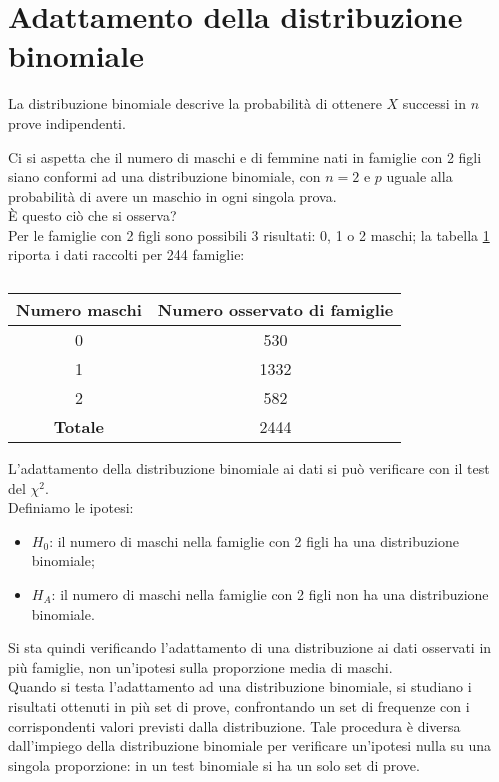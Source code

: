 \documentclass[drafts, 10pt]{book}
\newcounter{example}[section]
\begin{document}
\section{Adattamento della distribuzione binomiale}

La distribuzione binomiale descrive la probabilità di ottenere $X$ successi in $n$ prove indipendenti.

\begin{example}
Ci si aspetta che il numero di maschi e di femmine nati in famiglie con 2 figli siano conformi ad una distribuzione binomiale, con $n =2$ e $p$ uguale alla probabilità di avere un maschio in ogni singola prova.
\\
È questo ciò che si osserva?
\\
Per le famiglie con 2 figli sono possibili 3 risultati: 0, 1 o 2 maschi; la tabella \ref{tabmaschi} riporta i dati raccolti per 244 famiglie:
    \begin{table}[H]
        \centering
        \renewcommand\arraystretch{1.2}
        \begin{tabular}{c|c}
        \hline
        \textbf{Numero maschi} & \textbf{Numero osservato di famiglie} \\
        \hline
        0 & 530 \\
        1 & 1332 \\
        2 & 582 \\
        \hline
        \textbf{Totale} & 2444 \\
        \hline
        \end{tabular}
        \caption{}
        \label{tabmaschi}
    \end{table}\noindent
    L'adattamento della distribuzione binomiale ai dati si può verificare con il test del $\chi^2$.
    \\
Definiamo le ipotesi:
    \begin{itemize}
    \item $H_0$: il numero di maschi nella famiglie con 2 figli ha una distribuzione binomiale;
    \item $H_A$: il numero di maschi nella famiglie con 2 figli non ha una distribuzione binomiale.
    \end{itemize}
    Si sta quindi verificando l'adattamento di una distribuzione ai dati osservati in più famiglie, non un'ipotesi sulla proporzione media di maschi.
    \\
    Quando si testa l'adattamento ad una distribuzione binomiale, si studiano i risultati ottenuti in più set di prove, confrontando un set di frequenze con i corrispondenti valori previsti dalla distribuzione. Tale procedura è diversa dall'impiego della distribuzione binomiale per verificare un'ipotesi nulla su una singola proporzione: in un test binomiale si ha un solo set di prove.

\end{example}
\end{document}
